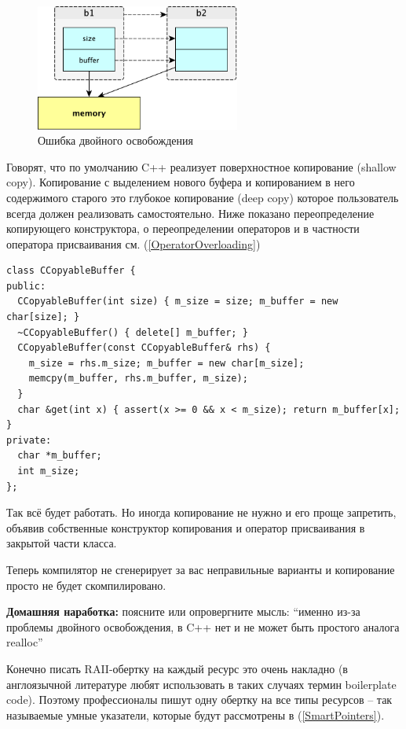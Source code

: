\documentclass[a4paper,12pt,oneside]{article}
\begin{document}
\begin{figure}[h!]
\centering
\includegraphics[width=0.6\textwidth]{illustrations/copying-crop.pdf}
\caption{Ошибка двойного освобождения}
\label{fig:copying-crop}
\end{figure}

Говорят, что по умолчанию C++ реализует поверхностное копирование (shallow copy). Копирование с выделением нового буфера и копированием в него содержимого старого это глубокое копирование (deep copy) которое пользователь всегда должен реализовать самостоятельно. Ниже показано переопределение копирующего конструктора, о переопределении операторов и в частности оператора присваивания см. (\ref{OperatorOverloading})

\begin{lstlisting}
class CCopyableBuffer {
public:
  CCopyableBuffer(int size) { m_size = size; m_buffer = new char[size]; }
  ~CCopyableBuffer() { delete[] m_buffer; }
  CCopyableBuffer(const CCopyableBuffer& rhs) { 
    m_size = rhs.m_size; m_buffer = new char[m_size];
    memcpy(m_buffer, rhs.m_buffer, m_size);
  } 
  char &get(int x) { assert(x >= 0 && x < m_size); return m_buffer[x]; } 
private:
  char *m_buffer;
  int m_size;
};
\end{lstlisting}

Так всё будет работать. Но иногда копирование не нужно и его проще запретить, объявив собственные конструктор копирования и оператор присваивания в закрытой части класса.



Теперь компилятор не сгенерирует за вас неправильные варианты и копирование просто не будет скомпилировано.

\textbf{Домашняя наработка:} поясните или опровергните мысль: ``именно из-за проблемы двойного освобождения, в C++ нет и не может быть простого аналога realloc''

Конечно писать RAII-обертку на каждый ресурс это очень накладно (в англоязычной литературе любят использовать в таких случаях термин boilerplate code). Поэтому профессионалы пишут одну обертку на все типы ресурсов -- так называемые умные указатели, которые будут рассмотрены в (\ref{SmartPointers}).
\end{document}
